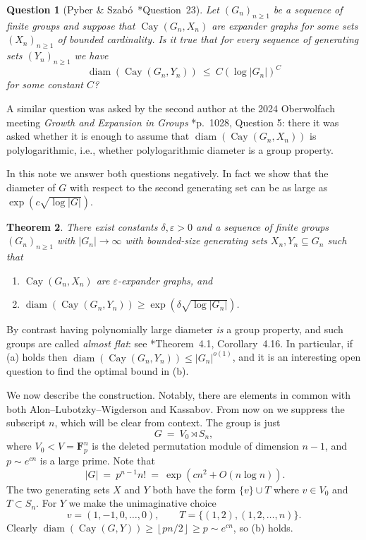 \documentclass[11pt]{amsart}
\numberwithin{equation}{section}
\newtheorem{theorem}{Theorem}[section]
\newtheorem{question}[theorem]{Question}
\theoremstyle{remark}
\newcommand{\op}{\operatorname}
\newcommand{\Cay}{\op{Cay}}
\newcommand{\diam}{\op{diam}}
\newcommand{\F}{\mathbf{F}}
\newcommand\br[1]{{\left(#1\right)}}
\newcommand\floor[1]{\left\lfloor{#1}\right\rfloor}
\newcommand\eps{\varepsilon}
\begin{document}
\begin{question}[Pyber \& Szab\'o~\cite{PS13}*{Question~23}]
    \label{quesPS}
    Let $(G_n)_{n \geq 1}$ be a sequence of finite groups and suppose that
    $\Cay(G_n,X_n)$ are expander graphs for some sets $(X_n)_{n \geq 1}$ of bounded cardinality.
    Is it true that for every sequence of generating sets $(Y_n)_{n \geq 1}$ we have
    $$ \diam( \Cay(G_n,Y_n) ) \> \le \> C (\log |G_n|)^C $$
    for some constant $C$?
\end{question}

A similar question was asked by the second author at the 2024 Oberwolfach meeting \emph{Growth and Expansion in Groups} \cite{BD24}*{p.~1028,  Question 5}:
there it was asked whether it is enough to assume that $\diam(\Cay(G_n, X_n))$ is polylogarithmic, i.e., whether polylogarithmic diameter is a group property.

In this note we answer both questions negatively. In fact we show that the diameter of $G$ with respect to the second generating set can be as large as $\exp(c \sqrt{\log |G|})$.

\begin{theorem} \label{thMain}
There exist constants $\delta, \eps > 0$ and a sequence of finite groups $(G_n)_{n \geq 1}$ with $|G_n| \to \infty$
with bounded-size generating sets $X_n, Y_n \subseteq G_n$ such that
\begin{enumerate}[\normalfont(a)]
    \item $\Cay(G_n,X_n)$ are $\eps$-expander graphs, and
    \item $\diam( \Cay(G_n,Y_n) ) \geq \exp(\delta \sqrt{\log|G_n|})$.
\end{enumerate}
\end{theorem}

By contrast having polynomially large diameter \emph{is} a group property,
and such groups are called \emph{almost flat}: see \cite{BT16}*{Theorem~4.1, Corollary~4.16}.
In particular, if (a) holds then $\diam(\Cay(G_n, Y_n)) \le |G_n|^{o(1)}$,
and it is an interesting open question to find the optimal bound in (b).

We now describe the construction.
Notably, there are elements in common with both Alon--Lubotzky--Wigderson and Kassabov.
From now on we suppress the subscript $n$, which will be clear from context.
The group is just
\[G \> = \> V_0 \rtimes S_n,\]
where $V_0 < V = \F_p^n$ is the deleted permutation module of dimension $n-1$,
and $p \sim e^{cn}$ is a large prime.
Note that
\[
    \> |G| \> = \> p^{n-1} n! \> = \> \exp\br{cn^2 + O(n \log n)} .
\]
The two generating sets $X$ and $Y$ both have the form $\{v\} \cup T$ where $v \in V_0$ and $T \subset S_n$.
For $Y$ we make the unimaginative choice
\[
    v = (1, -1, 0, \dots, 0), \qquad T = \{(1, 2), (1, 2, \dots, n) \}.
\]
Clearly $\diam(\Cay(G, Y)) \ge \floor{pn/2} \ge p \sim e^{cn}$, so (b) holds.
\end{document}
